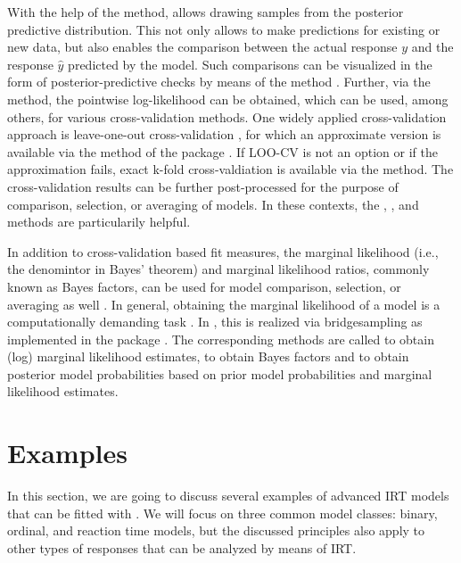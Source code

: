 \documentclass[jss]{jss}
\begin{document}
With the help of the  method,  allows
drawing samples from the posterior predictive distribution. This not
only allows to make predictions for existing or new data, but also
enables the comparison between the actual response \(y\) and the
response \(\hat{y}\) predicted by the model. Such comparisons can be
visualized in the form of posterior-predictive checks by means of the
 method \citep{gabry2019}. Further, via the
 method, the pointwise log-likelihood can be obtained,
which can be used, among others, for various cross-validation methods.
One widely applied cross-validation approach is leave-one-out
cross-validation \citep[LOO-CV;][]{vehtari2017loo}, for which an
approximate version is available via the  method of the
 package \citep{vehtari2017loo, vehtari2017psis}. If LOO-CV is
not an option or if the approximation fails, exact k-fold
cross-valdiation is available via the  method. The
cross-validation results can be further post-processed for the purpose
of comparison, selection, or averaging of models. In these contexts, the
, , and  methods
are particularily helpful.

In addition to cross-validation based fit measures, the marginal
likelihood (i.e., the denomintor in Bayes' theorem) and marginal
likelihood ratios, commonly known as Bayes factors, can be used for
model comparison, selection, or averaging as well \citep{kass1995}. In
general, obtaining the marginal likelihood of a model is a
computationally demanding task \citep{kass1995}. In , this is
realized via bridgesampling \citep{meng1996, meng2002} as implemented in
the  package \citep{bridgesampling}. The
corresponding methods are called  to obtain (log)
marginal likelihood estimates,  to obtain Bayes
factors and  to obtain posterior model probabilities
based on prior model probabilities and marginal likelihood estimates.

\hypertarget{examples}{%
\section{Examples}\label{examples}}

In this section, we are going to discuss several examples of advanced
IRT models that can be fitted with . We will focus on three
common model classes: binary, ordinal, and reaction time models, but the
discussed principles also apply to other types of responses that can be
analyzed by means of IRT.
\end{document}
